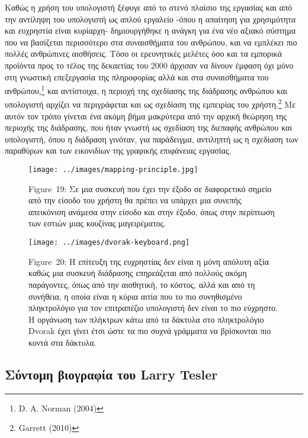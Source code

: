 \documentclass[
]{article}
\begin{document}
Καθώς η χρήση του υπολογιστή ξέφυγε από το στενό πλαίσιο της εργασίας
και από την αντίληψη του υπολογιστή ως απλού εργαλείο -όπου η απαίτηση
για χρησιμότητα και ευχρηστία είναι κυρίαρχη- δημιουργήθηκε η ανάγκη για
ένα νέο αξιακό σύστημα που να βασίζεται περισσότερο στα συναισθήματα του
ανθρώπου, και να εμπλέκει πιο πολλές ανθρώπινες αισθήσεις. Τόσο οι
ερευνητικές μελέτες όσο και τα εμπορικά προϊόντα προς το τέλος της
δεκαετίας του 2000 άρχισαν να δίνουν έμφαση όχι μόνο στη γνωστική
επεξεργασία της πληροφορίας αλλά και στα συναισθήματα του
ανθρώπου,\footnote{D. A. Norman (2004)} και αντίστοιχα, η περιοχή της
σχεδίασης της διάδρασης ανθρώπου και υπολογιστή αρχίζει να περιγράφεται
και ως σχεδίαση της εμπειρίας του χρήστη.\footnote{Garrett (2010)} Με
αυτόν τον τρόπο γίνεται ένα ακόμη βήμα μακρύτερα από την αρχική θεώρηση
της περιοχής της διάδρασης, που ήταν γνωστή ως σχεδίαση της διεπαφής
ανθρώπου και υπολογιστή, όπου η διάδραση γινόταν, για παράδειγμα,
αντιληπτή ως η σχεδίαση των παραθύρων και των εικονιδίων της γραφικής
επιφάνειας εργασίας.

\leavevmode{}%
\begin{figure}
\hypertarget{fig:mapping-principle}{%
\centering
\texttt{[image: ../images/mapping-principle.jpg]}
\caption{Figure~19: Σε μια συσκευή που έχει την έξοδο σε διαφορετικό
σημείο από την είσοδο του χρήστη θα πρέπει να υπάρχει μια συνεπής
απεικόνιση ανάμεσα στην είσοδο και στην έξοδο, όπως στην περίπτωση των
εστιών μιας κουζίνας μαγειρέματος.}\label{fig:mapping-principle}
}
\end{figure}

\leavevmode{}%
\begin{figure}
\hypertarget{fig:dvorak-keyboard}{%
\centering
\texttt{[image: ../images/dvorak-keyboard.png]}
\caption{Figure~20: Η επίτευξη της ευχρηστίας δεν είναι η μόνη απόλυτη
αξία καθώς μια συσκευή διάδρασης επηρεάζεται από πολλούς ακόμη
παράγοντες, όπως από την αισθητική, το κόστος, αλλά και από τη συνήθεια,
η οποία είναι η κύρια αιτία που το πιο συνηθισμένο πληκτρολόγιο για τον
επιτραπέζιο υπολογιστή δεν είναι το πιο εύχρηστο. Η οργάνωση των
πλήκτρων κάτω από τα δάκτυλα στο πληκτρολόγιο Dvorak έχει γίνει έτσι
ώστε τα πιο συχνά γράμματα να βρίσκονται πιο κοντά στα
δάκτυλα.}\label{fig:dvorak-keyboard}
}
\end{figure}

\hypertarget{ux3c3ux3cdux3bdux3c4ux3bfux3bcux3b7-ux3b2ux3b9ux3bfux3b3ux3c1ux3b1ux3c6ux3afux3b1-ux3c4ux3bfux3c5-larry-tesler}{%
\subsection{Σύντομη βιογραφία του Larry
Tesler}\label{ux3c3ux3cdux3bdux3c4ux3bfux3bcux3b7-ux3b2ux3b9ux3bfux3b3ux3c1ux3b1ux3c6ux3afux3b1-ux3c4ux3bfux3c5-larry-tesler}}
\end{document}
